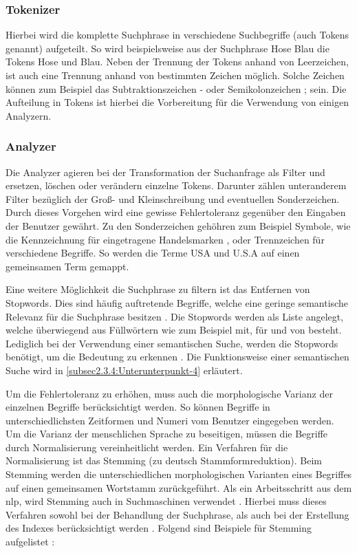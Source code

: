 \subsubsection{Tokenizer}

Hierbei wird die komplette Suchphrase in verschiedene Suchbegriffe (auch Tokens genannt) aufgeteilt. So wird beispielsweise aus der Suchphrase \glqq Hose Blau\grqq{} die Tokens \glqq Hose\grqq{} und \glqq Blau\grqq{}. Neben der Trennung der Tokens anhand von Leerzeichen, ist auch eine Trennung anhand von bestimmten Zeichen möglich. Solche Zeichen können zum Beispiel das Subtraktionszeichen \glqq -\grqq{} oder Semikolonzeichen \glqq ;\grqq{} sein. Die Aufteilung in Tokens ist hierbei die Vorbereitung für die Verwendung von einigen Analyzern.

\subsubsection{Analyzer}

Die Analyzer agieren bei der Transformation der Suchanfrage als Filter und ersetzen, löschen oder verändern einzelne Tokens. Darunter zählen unteranderem Filter bezüglich der Groß- und Kleinschreibung und eventuellen Sonderzeichen. Durch dieses Vorgehen wird eine gewisse Fehlertoleranz gegenüber den Eingaben der Benutzer gewährt. Zu den Sonderzeichen gehöhren zum Beispiel Symbole, wie die Kennzeichnung für eingetragene Handelsmarken \glqq \textregistered\grqq{}, oder Trennzeichen für verschiedene Begriffe. So werden die Terme \glqq USA\grqq{} und \glqq U.S.A\grqq{} auf einen gemeinsamen Term gemappt.

Eine weitere Möglichkeit die Suchphrase zu filtern ist das Entfernen von Stopwords. Dies sind häufig auftretende Begriffe, welche eine geringe semantische Relevanz für die Suchphrase besitzen \cite{SebastianRuss.2017}. Die Stopwords werden als Liste angelegt, welche überwiegend aus Füllwörtern wie zum Beispiel \glqq mit\grqq{}, \glqq für\grqq{} und \glqq von\grqq{} besteht. Lediglich bei der Verwendung einer semantischen Suche, werden die Stopwords benötigt, um die Bedeutung zu erkennen \cite{SebastianRuss.2017}. Die Funktionsweise einer semantischen Suche wird in \autoref{subsec2.3.4:Unterunterpunkt-4} erläutert.

Um die Fehlertoleranz zu erhöhen, muss auch die morphologische Varianz der einzelnen Begriffe berücksichtigt werden. So können Begriffe in unterschiedlichsten Zeitformen und Numeri vom Benutzer eingegeben werden. Um die Varianz der menschlichen Sprache zu beseitigen, müssen die Begriffe durch Normalisierung vereinheitlicht werden. Ein Verfahren für die Normalisierung ist das \glqq Stemming\grqq{} (zu deutsch Stammformreduktion). Beim Stemming werden die unterschiedlichen morphologischen Varianten eines Begriffes auf einen gemeinsamen Wortstamm zurückgeführt. Als ein Arbeitsschritt aus dem \gls{nlp}, wird Stemming auch in Suchmaschinen verwendet \cite{StefanLuber.2020}. Hierbei muss dieses Verfahren sowohl bei der Behandlung der Suchphrase, als auch bei der Erstellung des Indexes berücksichtigt werden \cite{SebastianRuss.2017}. Folgend sind Beispiele für Stemming aufgelistet \cite{SebastianRuss.2017}:

